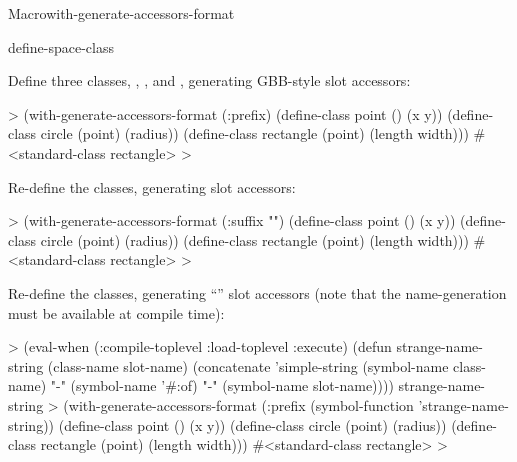 \documentclass[10pt,twoside,english,pdftex]{article}
\begin{document}
\begin{functiondoc}{Macro}{with-generate-accessors-format}
\begin{alsos}{define-space-class}
\end{alsos}

\fnexamples Define three classes, , , and
, generating GBB-style
 slot accessors:
%
\W\supp
\begin{example}
  > (with-generate-accessors-format (:prefix)
      (define-class point ()
        (x y))
      (define-class circle (point)
        (radius))
      (define-class rectangle (point)
        (length width)))
  #<standard-class rectangle>
  >
\end{example}
%
Re-define the classes, generating  slot
accessors:
%
\W\supp\notpretop
\begin{example}
  > (with-generate-accessors-format (:suffix "")
      (define-class point ()
        (x y))
      (define-class circle (point)
        (radius))
      (define-class rectangle (point)
        (length width)))
  #<standard-class rectangle>
  >
\end{example}
%
Re-define the classes, generating
``'' slot accessors (note that the
 name-generation  must be
available at compile time):
%
\W\supp\notpretop
\begin{example}
  > (eval-when (:compile-toplevel :load-toplevel :execute)
      (defun strange-name-string (class-name slot-name)
        (concatenate 'simple-string
          (symbol-name class-name) "-" 
          (symbol-name '#:of) "-" 
          (symbol-name slot-name))))
  strange-name-string
  > (with-generate-accessors-format (:prefix (symbol-function 'strange-name-string))
      (define-class point ()
        (x y))
      (define-class circle (point)
        (radius))
      (define-class rectangle (point)
        (length width)))
  #<standard-class rectangle>
  >
\end{example}

\end{functiondoc}

\end{document}
